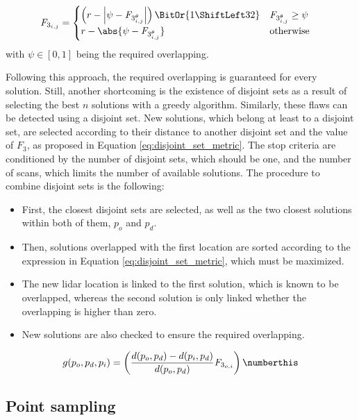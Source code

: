 \begin{gather}
    \label{eq:loo}
    \begin{aligned}
        \textit{F}_{3_{i, j}} &=
        \begin{cases}
            \left(r - \left|\psi - \textit{F}_{3_{i, j}^\theta}\right|\right) \BitOr{1 \ShiftLeft 32} &\textit{F}_{3_{i, j}^\theta} \geq \psi\\
            r - \abs{\psi - \textit{F}_{3_{i, j}^\theta}} &\text{otherwise}
        \end{cases}
    \end{aligned}
\end{gather}
with $\psi \in [0, 1]$ being the required overlapping.

Following this approach, the required overlapping is guaranteed for every solution. Still, another shortcoming is the existence of disjoint sets as a result of selecting the best $n$ solutions with a greedy algorithm. Similarly, these flaws can be detected using a disjoint set. New solutions, which belong at least to a disjoint set, are selected according to their distance to another disjoint set and the value of $F_3$, as proposed in Equation \ref{eq:disjoint_set_metric}. The stop criteria are conditioned by the number of disjoint sets, which should be one, and the number of scans, which limits the number of available solutions. The procedure to combine disjoint sets is the following:
\begin{itemize}
    \item First, the closest disjoint sets are selected, as well as the two closest solutions within both of them, $p_o$ and $p_d$.
    \item Then, solutions overlapped with the first location are sorted according to the expression in Equation \ref{eq:disjoint_set_metric}, which must be maximized. 
    \item The new \acrshort{lidar} location is linked to the first solution, which is known to be overlapped, whereas the second solution is only linked whether the overlapping is higher than zero. 
    \item New solutions are also checked to ensure the required overlapping.
\end{itemize}
\begin{align*}
    g(p_o, p_d, p_i) = \left(\frac{d(p_o, p_d) - d(p_i, p_d)}{d(p_o, p_d)} \textit{F}_{3_{o, i}}\right)
    \numberthis \label{eq:disjoint_set_metric}
\end{align*}

\subsection{Point sampling}

